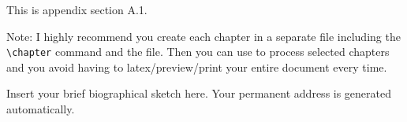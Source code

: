 \documentclass[11pt]{afthesis}
\begin{document}
This is appendix section A.1.

Note: I highly recommend you create each chapter in a separate file
including the \verb|\chapter| command and \verb|| the file.
Then you can use \verb|| to process selected chapters and
you avoid having to latex/preview/print your entire document every
time.






\begin{vita}
    Insert your brief biographical sketch here. Your permanent
    address is generated automatically.
\end{vita}

\end{document}
